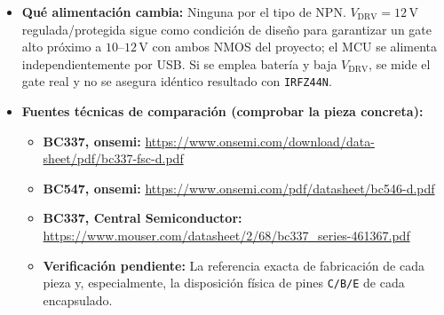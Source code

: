 \documentclass[10pt, a4paper, landscape]{article}
\begin{document}
\begin{itemize}[noitemsep, topsep=3pt]
    \item \textbf{Qué alimentación cambia:} Ninguna por el tipo de NPN. $V_{\text{DRV}}=12\,\text{V}$ regulada/protegida sigue como condición de diseño para garantizar un gate alto próximo a $10\text{--}12\,\text{V}$ con ambos NMOS del proyecto; el MCU se alimenta independientemente por USB. Si se emplea batería y baja $V_{\text{DRV}}$, se mide el gate real y no se asegura idéntico resultado con \texttt{IRFZ44N}.
    \item \textbf{Fuentes técnicas de comparación (comprobar la pieza concreta):}
    \begin{itemize}[noitemsep, topsep=1pt]
        \item \textbf{BC337, onsemi:} \url{https://www.onsemi.com/download/data-sheet/pdf/bc337-fsc-d.pdf}
        \item \textbf{BC547, onsemi:} \url{https://www.onsemi.com/pdf/datasheet/bc546-d.pdf}
        \item \textbf{BC337, Central Semiconductor:} \url{https://www.mouser.com/datasheet/2/68/bc337_series-461367.pdf}
        \item \textbf{Verificación pendiente:} La referencia exacta de fabricación de cada pieza y, especialmente, la disposición física de pines \texttt{C/B/E} de cada encapsulado.
    \end{itemize}
\end{itemize}
\end{document}

